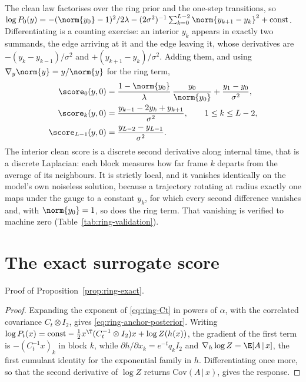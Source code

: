 The clean law factorises over the ring prior and the one-step transitions, so
$\log P_0(y) = -(\norm{y_0}-1)^2/2\lambda
- (2\sigma^2)^{-1}\sum_{k=0}^{L-2}\norm{y_{k+1}-y_k}^2 + \text{const}$.
Differentiating is a counting exercise: an interior $y_k$ appears in exactly two
summands, the edge arriving at it and the edge leaving it, whose derivatives are
$-(y_k - y_{k-1})/\sigma^2$ and $+(y_{k+1} - y_k)/\sigma^2$. Adding them, and
using $\nabla_y \norm{y} = y/\norm{y}$ for the ring term,
\begin{align}
  \score_0(y,0)
    &= \frac{1-\norm{y_0}}{\lambda}\,\frac{y_0}{\norm{y_0}}
       + \frac{y_1 - y_0}{\sigma^2},
  \notag \\
  \score_k(y,0)
    &= \frac{y_{k-1} - 2y_k + y_{k+1}}{\sigma^2},
       \qquad 1 \le k \le L-2,
  \label{eq:ring-clean-score} \\
  \score_{L-1}(y,0)
    &= \frac{y_{L-2}-y_{L-1}}{\sigma^2} .
  \notag
\end{align} The interior clean score is a
discrete second derivative along internal time, that is a discrete Laplacian:
each block measures how far frame $k$ departs from the average of its
neighbours. It is strictly local, and it vanishes identically on the model's
own noiseless solution, because a trajectory rotating at radius exactly one
maps under the gauge to a constant $y_k$, for which every second difference
vanishes and, with $\norm{y_0} = 1$, so does the ring term. That vanishing is
verified to machine zero (Table~\ref{tab:ring-validation}).

\section{The exact surrogate score}

Proof of Proposition~\ref{prop:ring-exact}.

\begin{proof}
Expanding the exponent of \eqref{eq:ring-Ct} in powers of $\alpha$, with the
correlated covariance $C_t \otimes I_2$, gives
\eqref{eq:ring-anchor-posterior}. Writing
$\log P_t(x) = \text{const} - \tfrac12 x^{\T}(C_t^{-1}\otimes I_2)x
+ \log Z(h(x))$, the gradient of the first term is $-(C_t^{-1}x)_k$ in block
$k$, while $\partial h/\partial x_k = e^{-t}q_k I_2$ and
$\nabla_h \log Z = \E[A\,|\,x]$, the first cumulant identity for the
exponential family in $h$. Differentiating once more, so that the second
derivative of $\log Z$ returns $\mathrm{Cov}(A\,|\,x)$, gives the response.
\end{proof}
